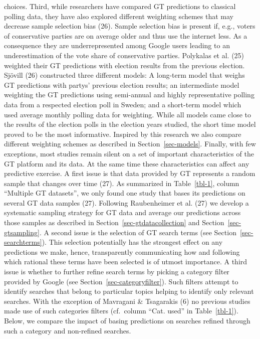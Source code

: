\documentclass[
  letterpaper,
  DIV=11,
  numbers=noendperiod]{scrartcl}
\begin{document}
choices. Third, while researchers have compared GT predictions to
classical polling data, they have also explored different weighting
schemes that may decrease sample selection bias (26). Sample selection
bias is present if, e.g., voters of conservative parties are on average
older and thus use the internet less. As a consequence they are
underrepresented among Google users leading to an underestimation of the
vote share of conservative parties. Polykalas et al. (25) weighted their
GT predictions with election results from the previous election. Sjövill
(26) constructed three different models: A long-term model that weighs
GT predictions with partys' previous election results; an intermediate
model weighting the GT predictions using semi-annual and highly
representative polling data from a respected election poll in Sweden;
and a short-term model which used average monthly polling data for
weighting. While all models came close to the results of the election
polls in the election years studied, the short time model proved to be
the most informative. Inspired by this research we also compare
different weighting schemes as described in Section~\ref{sec-models}.
Finally, with few exceptions, most studies remain silent on a set of
important characteristics of the GT platform and its data. At the same
time these characteristics can affect any predictive exercise. A first
issue is that data provided by GT represents a random sample that
changes over time (27). As summarized in Table~\ref{tbl-1}, column
``Multiple GT datasets'', we only found one study that bases its
predictions on several GT data samples (27). Following Raubenheimer et
al. (27) we develop a systematic sampling strategy for GT data and
average our predictions across those samples as described in
Section~\ref{sec-gtdatacollection} and Section~\ref{sec-gtsampling}. A
second issue is the selection of GT search terms (see
Section~\ref{sec-searchterms}). This selection potentially has the
strongest effect on any predictions we make, hence, transparently
communicating how and following which rational these terms have been
selected is of utmost importance. A third issue is whether to further
refine search terms by picking a category filter provided by Google (see
Section~\ref{sec-categoryfilter}). Such filters attempt to identify
searches that belong to particular topics helping to identify only
relevant searches. With the exception of Mavragani \& Tsagarakis (6) no
previous studies made use of such categories filters (cf.~column ``Cat.
used'' in Table~\ref{tbl-1}). Below, we compare the impact of basing
predictions on searches refined through such a category and non-refined
searches.
\end{document}
